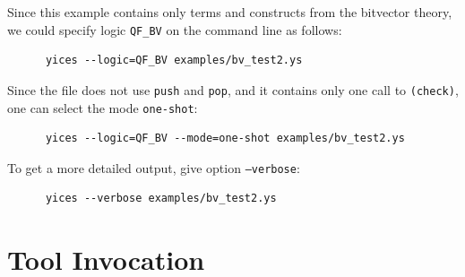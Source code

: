\documentclass[11pt,twoside,fleqn,openright,titlepage]{cslreport}
\begin{document}
\medskip\noindent
Since  this  example  contains  only  terms and  constructs  from  the
bitvector  theory,  we  could  specify logic  \texttt{QF\_BV}  on  the
command line as follows:
\begin{small}
\begin{verbatim}
      yices --logic=QF_BV examples/bv_test2.ys
\end{verbatim}
\end{small}
Since the file does not use \texttt{push} and \texttt{pop}, and it
contains only one call to \texttt{(check)}, one can select the mode
\texttt{one-shot}:
\begin{small}
\begin{verbatim}
      yices --logic=QF_BV --mode=one-shot examples/bv_test2.ys
\end{verbatim}
\end{small}
To get a more detailed output, give option \texttt{--verbose}:
\begin{small}
\begin{verbatim}
      yices --verbose examples/bv_test2.ys
\end{verbatim}
\end{small}

\section{Tool Invocation}
\end{document}
